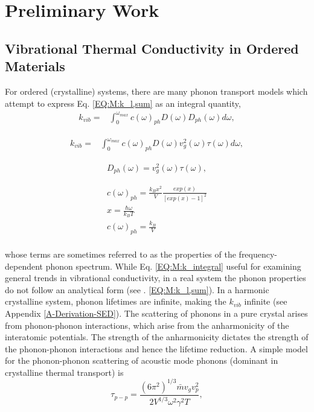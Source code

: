 \documentclass[letterpaper,12pt]{article}
\begin{document}
\section{\label{S-Prelim}Preliminary Work}
\subsection{\label{S-Prelim-Vib-Cond-Ordered}Vibrational Thermal Conductivity in Ordered Materials}
For ordered (crystalline) systems, there are many phonon transport models which attempt to express Eq$.$ \eqref{EQ:M:k_l,sum} as an integral quantity,\cite{callaway1959,holland1963}
\begin{equation}\label{EQ:M:k_integral}
\begin{split}
k_{vib}=& \int_{0}^{\omega_{max}} c(\omega)_{ph} D(\omega) D_{ph}(\omega) d\omega,
\end{split}
\end{equation}

\begin{equation}\label{EQ:M:k_integral}
\begin{split}
k_{vib}=& \int_{0}^{\omega_{max}} c(\omega)_{ph} D(\omega) v^2_g(\omega)\tau(\omega) d\omega,
\end{split}
\end{equation}

\begin{equation}\label{EQ:M:D_ph}
\begin{split}
D_{ph}(\omega) = v^2_g(\omega)\tau(\omega), 
\end{split}
\end{equation}


\begin{equation}\label{EQ:M:k_integral}
\begin{split}
c(\omega)_{ph} = \frac{k_{B}x^2}{V} \frac{exp(x)}{[exp(x)-1]^2} \\
x = \frac{\hbar\omega}{k_{B}T} \\
c(\omega)_{ph} =\frac{k_{B}}{V} \\
\end{split}
\end{equation}


whose terms are sometimes referred to as the properties of the frequency-dependent phonon spectrum. While Eq$.$ \eqref{EQ:M:k_integral} useful for examining general trends in vibrational conductivity, in a real system the phonon properties do not follow an analytical form (see $.$ \eqref{EQ:M:k_l,sum}). 
In a harmonic crystalline system, phonon lifetimes are infinite, making the $k_{vib}$ infinite (see Appendix \ref{A-Derivation-SED}). The scattering of phonons in a pure crystal arises from phonon-phonon interactions, which arise from the anharmonicity of the interatomic potentials. The strength of the anharmonicity dictates the strength of the phonon-phonon interactions and hence the lifetime reduction.\cite{turney2008b} A simple model for the phonon-phonon scattering of acoustic mode phonons (dominant in crystalline thermal transport) is
\begin{equation}\label{EQ:M:tau_p-p}
\tau_{p-p} = \frac{(6 \pi^2)^{1/3} \bar m v_g v_p^2}{2 V^{1/3} \omega^2 \gamma^2 T },
\end{equation}
\end{document}
